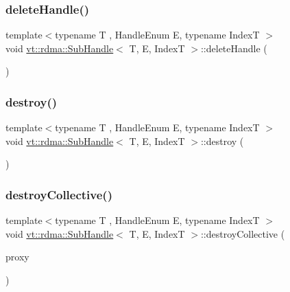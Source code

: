 \mbox{\label{structvt_1_1rdma_1_1_sub_handle_a1d472b924cb0ccfbb7abea085afc9c4d}} 
\subsubsection{\texorpdfstring{delete\+Handle()}{deleteHandle()}}
{\footnotesize\ttfamily template$<$typename T , Handle\+Enum E, typename IndexT $>$ \\
void \hyperlink{structvt_1_1rdma_1_1_sub_handle}{vt\+::rdma\+::\+Sub\+Handle}$<$ T, E, IndexT $>$\+::delete\+Handle (\begin{DoxyParamCaption}{ }\end{DoxyParamCaption})}

\mbox{\label{structvt_1_1rdma_1_1_sub_handle_a869dcc54734a9ff371e0970af2c2c674}} 
\subsubsection{\texorpdfstring{destroy()}{destroy()}}
{\footnotesize\ttfamily template$<$typename T , Handle\+Enum E, typename IndexT $>$ \\
void \hyperlink{structvt_1_1rdma_1_1_sub_handle}{vt\+::rdma\+::\+Sub\+Handle}$<$ T, E, IndexT $>$\+::destroy (\begin{DoxyParamCaption}{ }\end{DoxyParamCaption})}

\mbox{\label{structvt_1_1rdma_1_1_sub_handle_a1c85a7f35e134ae88ee2ee74ea3e64f2}} 
\subsubsection{\texorpdfstring{destroy\+Collective()}{destroyCollective()}}
{\footnotesize\ttfamily template$<$typename T , Handle\+Enum E, typename IndexT $>$ \\
void \hyperlink{structvt_1_1rdma_1_1_sub_handle}{vt\+::rdma\+::\+Sub\+Handle}$<$ T, E, IndexT $>$\+::destroy\+Collective (\begin{DoxyParamCaption}\item[{\hyperlink{structvt_1_1rdma_1_1_sub_handle_a758bee2e499658cfef92ace83eea6590}{Proxy\+Type}}]{proxy }\end{DoxyParamCaption})\hspace{0.3cm}{\ttfamily [static]}}

